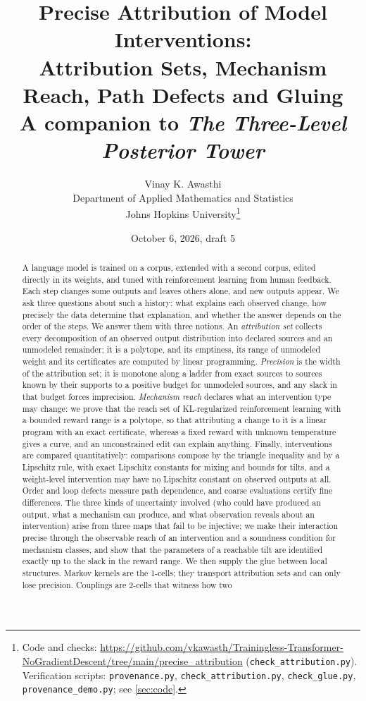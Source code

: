 \documentclass[11pt]{article}
\title{Precise Attribution of Model Interventions:\\
Attribution Sets, Mechanism Reach, Path Defects and Gluing\\[4pt]
\large A companion to \emph{The Three-Level Posterior Tower}}
\author{Vinay K. Awasthi\\
Department of Applied Mathematics and Statistics\\
Johns Hopkins University\thanks{Code and checks: \url{https://github.com/vkawasth/Trainingless-Transformer-NoGradientDescent/tree/main/precise_attribution} (\texttt{check\_attribution.py}). Verification scripts: \texttt{provenance.py},
\texttt{check\_attribution.py}, \texttt{check\_glue.py}, \texttt{provenance\_demo.py}; see \cref{sec:code}.}}
\date{October 6, 2026, draft 5}
\theoremstyle{definition}
\theoremstyle{remark}
\begin{document}
\maketitle

\begin{abstract}
A language model is trained on a corpus, extended with a second corpus, edited directly in its
weights, and tuned with reinforcement learning from human feedback. Each step changes some outputs
and leaves others alone, and new outputs appear. We ask three questions about such a history: what
explains each observed change, how precisely the data determine that explanation, and whether the
answer depends on the order of the steps. We answer them with three notions. An \emph{attribution
set} collects every decomposition of an observed output distribution into declared sources and an
unmodeled remainder; it is a polytope, and its emptiness, its range of unmodeled weight and its
certificates are computed by linear programming. \emph{Precision} is the width of the attribution
set; it is monotone along a ladder from exact sources to sources known by their supports to a
positive budget for unmodeled sources, and any slack in that budget forces imprecision.
\emph{Mechanism reach} declares what an intervention type may change: we prove that the reach set of
KL-regularized reinforcement learning with a bounded reward range is a polytope, so that attributing
a change to it is a linear program with an exact certificate, whereas a fixed reward with unknown
temperature gives a curve, and an unconstrained edit can explain anything. Finally, interventions are
compared quantitatively: comparisons compose by the triangle inequality and by a Lipschitz rule, with
exact Lipschitz constants for mixing and bounds for tilts, and a weight-level intervention may have no
Lipschitz constant on observed outputs at all. Order and loop defects measure path dependence, and
coarse evaluations certify fine differences. The three kinds of uncertainty involved (who could
have produced an output, what a mechanism can produce, and what observation reveals about an
intervention) arise from three maps that fail to be injective; we make their interaction precise
through the observable reach of an intervention and a soundness condition for mechanism classes, and
show that the parameters of a reachable tilt are identified exactly up to the slack in the reward
range. We then supply the glue between local structures. Markov kernels are the 1-cells; they
transport attribution sets and can only lose precision. Couplings are 2-cells that witness how two

\end{abstract}
\end{document}

